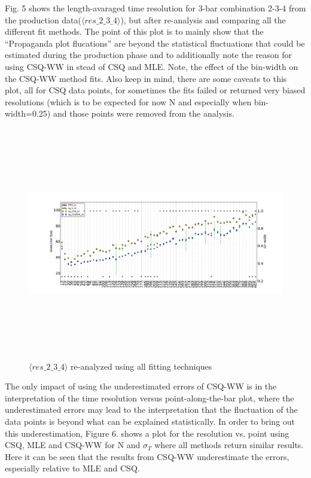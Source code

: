\documentclass[12pt]{article}
\begin{document}
Fig. 5 shows the length-avaraged time resolution for 3-bar combination 2-3-4 from the production data($\langle res\_2\_3\_4 \rangle$), but after re-analysis and comparing all the different fit methods. The point of this plot is to mainly show that the ``Propaganda plot flucations'' are beyond the statistical fluctuations that could be estimated during the production phase and to additionally note the reason for using CSQ-WW in stead of CSQ and MLE. Note, the effect of the bin-width on the CSQ-WW method fits. Also keep in mind, there are some caveats to this plot, all for CSQ data points, for sometimes the fits failed or returned very biased resolutions (which is to be expected for now N and especially when bin-width=0.25) and those points were removed from the analysis. 

\begin{figure}[ht]
	\includegraphics[height=4in,width=6in]{bar_stats_averages.pdf}
	\caption{ $\langle res\_2\_3\_4 \rangle$ re-analyzed using all fitting techniques}
	\label{fig5}
\end{figure}

The only impact of using the underestimated errors of CSQ-WW is in the interpretation of the time resolution versus point-along-the-bar plot, where the underestimated errors may lead to the interpretation that the fluctuation of the data points is beyond what can be explained statistically. In order to bring out this underestimation, Figure 6. shows a plot for the resolution vs. point using CSQ, MLE and CSQ-WW for N and $\sigma_{T}$ where all methods return similar results. Here it can be seen that the results from CSQ-WW underestimate the errors, especially relative to MLE and CSQ.
\end{document}
